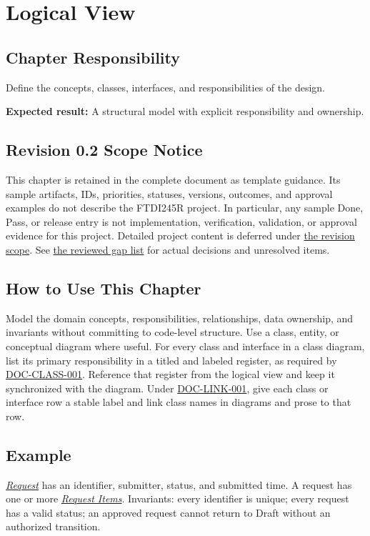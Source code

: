 \chapter{Logical View}
\section{Chapter Responsibility}
\label{Section:LogicalViewResponsibility}
Define the concepts, classes, interfaces, and responsibilities of the design.

\noindent\textbf{Expected result:} A structural model with explicit responsibility and ownership.

\section{Revision 0.2 Scope Notice}
\label{Section:DeferredLogicalView}
\begin{fsaNote}
This chapter is retained in the complete document as template guidance.
Its sample artifacts, IDs, priorities, statuses, versions, outcomes, and
approval examples do not describe the FTDI245R project. In particular, any
sample Done, Pass, or release entry is not implementation, verification,
validation, or approval evidence for this project. Detailed project content
is deferred under \hyperref[Section:ProjectScope]{the revision scope}.
See \hyperref[Table:ProjectGapReview]{the reviewed gap list} for actual
decisions and unresolved items.
\end{fsaNote}

\section{How to Use This Chapter}
Model the domain concepts, responsibilities, relationships, data ownership, and invariants without committing to code-level structure. Use a class, entity, or conceptual diagram where useful. For every class and interface in a class diagram, list its primary responsibility in a titled and labeled register, as required by \hyperref[Requirement:DOCCLASS001]{DOC-CLASS-001}. Reference that register from the logical view and keep it synchronized with the diagram. Under \hyperref[Requirement:DOCLINK001]{DOC-LINK-001}, give each class or interface row a stable label and link class names in diagrams and prose to that row.
\section{Example}
\hyperref[Class:Request]{\textit{Request}} has an identifier, submitter, status, and submitted time. A request has one or more \hyperref[Class:RequestItem]{\textit{Request Items}}. Invariants: every identifier is unique; every request has a valid status; an approved request cannot return to Draft without an authorized transition.


